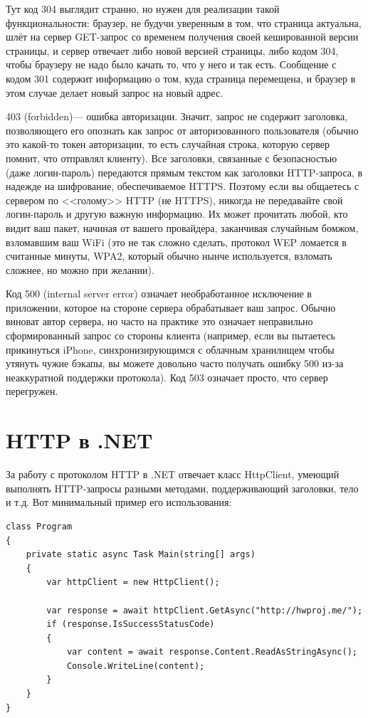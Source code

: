 \documentclass[a5paper]{article}
\begin{document}
Тут код 304 выглядит странно, но нужен для реализации такой функциональности: браузер, не будучи уверенным в том, что страница актуальна, шлёт на сервер GET-запрос со временем получения своей кешированной версии страницы, и сервер отвечает либо новой версией страницы, либо кодом 304, чтобы браузеру не надо было качать то, что у него и так есть. Сообщение с кодом 301 содержит информацию о том, куда страница перемещена, и браузер в этом случае делает новый запрос на новый адрес.

403 (forbidden)--- ошибка авторизации. Значит, запрос не содержит заголовка, позволяющего его опознать как запрос от авторизованного пользователя (обычно это какой-то токен авторизации, то есть случайная строка, которую сервер помнит, что отправлял клиенту). Все заголовки, связанные с безопасностью (даже логин-пароль) передаются прямым текстом как заголовки HTTP-запроса, в надежде на шифрование, обеспечиваемое HTTPS. Поэтому если вы общаетесь с сервером по <<голому>> HTTP (не HTTPS), никогда не передавайте свой логин-пароль и другую важную информацию. Их может прочитать любой, кто видит ваш пакет, начиная от вашего провайдера, заканчивая случайным бомжом, взломавшим ваш WiFi (это не так сложно сделать, протокол WEP ломается в считанные минуты, WPA2, который обычно нынче используется, взломать сложнее, но можно при желании).

Код 500 (internal server error) означает необработанное исключение в приложении, которое на стороне сервера обрабатывает ваш запрос. Обычно виноват автор сервера, но часто на практике это означает неправильно сформированный запрос со стороны клиента (например, если вы пытаетесь прикинуться iPhone, синхронизирующимся с облачным хранилищем чтобы утянуть чужие бэкапы, вы можете довольно часто получать ошибку 500 из-за неаккуратной поддержки протокола). Код 503 означает просто, что сервер перегружен.

\section{HTTP в .NET}

За работу с протоколом HTTP в .NET отвечает класс HttpClient, умеющий выполнять HTTP-запросы разными методами, поддерживающий заголовки, тело и т.д. Вот минимальный пример его использования: 

\begin{verbatim}
class Program
{
    private static async Task Main(string[] args)
    {
        var httpClient = new HttpClient();

        var response = await httpClient.GetAsync("http://hwproj.me/");
        if (response.IsSuccessStatusCode)
        {
            var content = await response.Content.ReadAsStringAsync();
            Console.WriteLine(content);
        }
    }
}
\end{verbatim}
\end{document}
